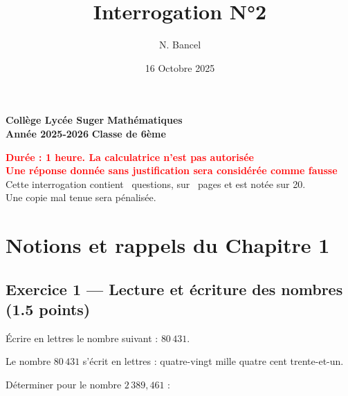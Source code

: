\documentclass[answers]{exam}
\title{Interrogation N°2}
\author{N. Bancel}
\date{16 Octobre 2025}
\begin{document}
\textbf{Collège Lycée Suger}
\hfill
\textbf{Mathématiques} \\

\textbf{Année 2025-2026}
\hfill
\textbf{Classe de 6ème} \par

{\let\newpage\relax\maketitle}

\begin{center}
\textbf{\textcolor{red}{Durée : 1 heure. La calculatrice n'est pas autorisée}} \\
\textbf{\textcolor{red}{Une réponse donnée sans justification sera considérée comme fausse}} \\
Cette interrogation contient \numquestions\ questions, sur \numpages\ pages et est notée sur 20. \\
Une copie mal tenue sera pénalisée.

\end{center}

\section*{Notions et rappels du Chapitre 1}

\subsection*{Exercice 1 — Lecture et écriture des nombres (1.5 points)}

\begin{questions}
  \question[0.5] Écrire en lettres le nombre suivant : \quad $80\,431$.

  \begin{solution}
Le nombre $80\,431$ s'écrit en lettres : quatre-vingt mille quatre cent trente-et-un.
\end{solution}

  \question[1] Déterminer pour le nombre $2\,389,461$ :
\end{questions}
\end{document}
